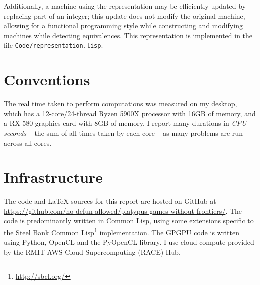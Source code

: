 Additionally, a machine using the representation may be efficiently
updated by replacing part of an integer; this update does not modify
the original machine, allowing for a functional programming style
while constructing and modifying machines while detecting
equivalences. This representation is implemented in the file
\texttt{Code/representation.lisp}.

\section{Conventions}

The real time taken to perform computations was measured on my
desktop, which has a 12-core/24-thread Ryzen 5900X processor with 16GB
of memory, and a RX 580 graphics card with 8GB of memory. I report
many durations in \emph{CPU-seconds} -- the sum of all times taken
by each core -- as many problems are run across all cores.

\section{Infrastructure}

The code and {\selectfont \LaTeX} sources for this report
are hosted on GitHub at \url{https://github.com/no-defun-allowed/platypus-games-without-frontiers/}.
The code is predominantly written in Common Lisp, using some
extensions specific to the Steel Bank Common
Lisp\footnote{\url{http://sbcl.org/}} implementation. The GPGPU code is
written using Python, OpenCL and the PyOpenCL library.
I use cloud compute provided by the RMIT AWS Cloud Supercomputing
(RACE) Hub.